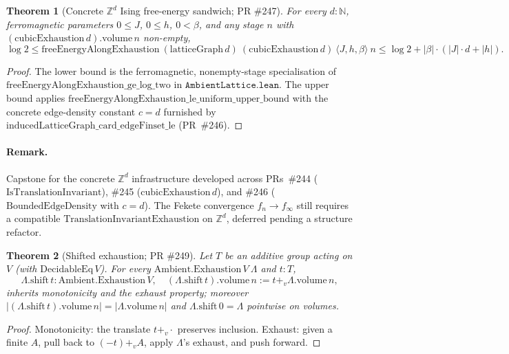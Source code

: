 \documentclass[a4paper,11pt]{article}
\newtheorem{theorem}{Theorem}
\begin{document}
\begin{theorem}[Concrete $\mathbb{Z}^d$ Ising free-energy sandwich; PR \#247]
For every $d : \mathbb{N}$, ferromagnetic parameters $0 \le J$,
$0 \le h$, $0 < \beta$, and any stage $n$ with $(\mathrm{cubicExhaustion}\,d)
.\mathrm{volume}\,n$ non-empty,
\[
  \log 2
    \le \mathrm{freeEnergyAlongExhaustion}\ (\mathrm{latticeGraph}\,d)\
        (\mathrm{cubicExhaustion}\,d)\ \langle J, h, \beta\rangle\ n
    \le \log 2 + |\beta| \cdot (|J| \cdot d + |h|).
\]
\end{theorem}
\begin{proof}
The lower bound is the ferromagnetic, nonempty-stage specialisation
of $\mathrm{freeEnergyAlongExhaustion\_ge\_log\_two}$ in
$\texttt{AmbientLattice.lean}$. The upper bound applies
$\mathrm{freeEnergyAlongExhaustion\_le\_uniform\_upper\_bound}$ with
the concrete edge-density constant $c = d$ furnished by
$\mathrm{inducedLatticeGraph\_card\_edgeFinset\_le}$ (PR~\#246).
\end{proof}

\paragraph{Remark.}
Capstone for the concrete $\mathbb{Z}^d$ infrastructure developed
across PRs~\#244 ($\mathrm{IsTranslationInvariant}$),
\#245 ($\mathrm{cubicExhaustion}\,d$), and \#246
($\mathrm{BoundedEdgeDensity}$ with $c = d$). The Fekete convergence
$f_n \to f_\infty$ still requires a compatible
$\mathrm{TranslationInvariantExhaustion}$ on $\mathbb{Z}^d$, deferred
pending a structure refactor.

\begin{theorem}[Shifted exhaustion; PR \#249]
Let $T$ be an additive group acting on $V$ (with $\mathrm{DecidableEq}\,V$).
For every $\mathrm{Ambient.Exhaustion}\,V\ \Lambda$ and $t : T$,
\[
  \Lambda.\mathrm{shift}\,t : \mathrm{Ambient.Exhaustion}\,V,
  \quad (\Lambda.\mathrm{shift}\,t).\mathrm{volume}\,n := t +_v \Lambda.\mathrm{volume}\,n,
\]
inherits monotonicity and the exhaust property; moreover
$|(\Lambda.\mathrm{shift}\,t).\mathrm{volume}\,n| = |\Lambda.\mathrm{volume}\,n|$
and $\Lambda.\mathrm{shift}\,0 = \Lambda$ pointwise on volumes.
\end{theorem}
\begin{proof}
Monotonicity: the translate $t +_v \cdot$ preserves inclusion.
Exhaust: given a finite $A$, pull back to $(-t) +_v A$, apply
$\Lambda$'s exhaust, and push forward.
\end{proof}
\end{document}
